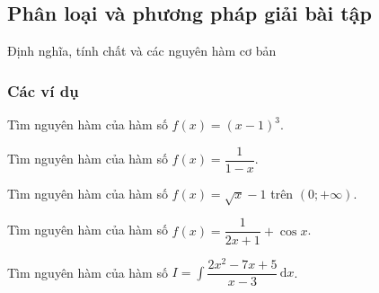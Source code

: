 \subsection{Phân loại và phương pháp giải bài tập}
\begin{dang}{Định nghĩa, tính chất và các nguyên hàm cơ bản}
\end{dang}
\subsubsection{Các ví dụ}
\begin{vd}%
	Tìm nguyên hàm của hàm số $f(x)=(x-1)^3$.
\end{vd}%
\begin{vd}%
	Tìm nguyên hàm của hàm số $f(x)=\dfrac{1}{1-x}$.	
\end{vd}%
\begin{vd}%
	Tìm nguyên hàm của hàm số $f(x)=\sqrt{x}-1$ trên $(0;+\infty)$.
\end{vd}%
\begin{vd}%
	Tìm nguyên hàm của hàm số $f(x)=\dfrac{1}{2x+1}+\cos x$.
\end{vd}%
\begin{vd}%
	Tìm nguyên hàm của hàm số $I=\displaystyle\int\dfrac{2x^2-7x+5}{x-3}\mathrm{\,d}x$.
\end{vd}
